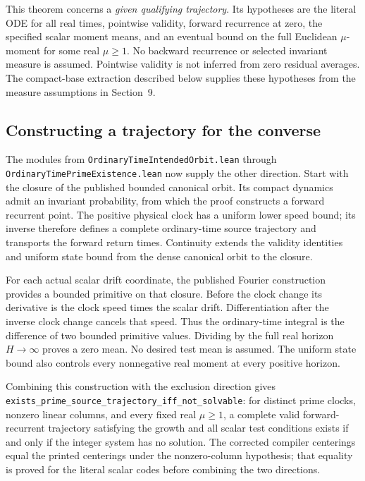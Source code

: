 \documentclass[11pt]{article}
\newcommand{\code}[1]{{\small\nolinkurl{#1}}}
\begin{document}
This theorem concerns a \emph{given qualifying trajectory}. Its hypotheses
are the literal ODE for all real times, pointwise validity, forward
recurrence at zero, the specified scalar moment means, and an eventual
bound on the full Euclidean $\mu$-moment for some real $\mu\ge1$.
No backward recurrence or selected invariant measure is assumed.
Pointwise validity is not inferred from zero residual averages.
The compact-base extraction described below supplies these hypotheses
from the measure assumptions in Section~9.

\subsection{Constructing a trajectory for the converse}

The modules from \code{OrdinaryTimeIntendedOrbit.lean} through
\code{OrdinaryTimePrimeExistence.lean} now supply the other direction.
Start with the closure of the published bounded canonical orbit. Its
compact dynamics admit an invariant probability, from which the proof
constructs a forward recurrent point. The positive physical clock has a
uniform lower speed bound; its inverse therefore defines a complete
ordinary-time source trajectory and transports the forward return times.
Continuity extends the validity identities and uniform state bound from
the dense canonical orbit to the closure.

For each actual scalar drift coordinate, the published Fourier
construction provides a bounded primitive on that closure. Before the
clock change its derivative is the clock speed times the scalar drift.
Differentiation after the inverse clock change cancels that speed. Thus
the ordinary-time integral is the difference of two bounded primitive
values. Dividing by the full real horizon $H\to\infty$ proves a zero
mean. No desired test mean is assumed. The uniform state bound also
controls every nonnegative real moment at every positive horizon.

Combining this construction with the exclusion direction gives
\code{exists_prime_source_trajectory_iff_not_solvable}: for distinct
prime clocks, nonzero linear columns, and every fixed real $\mu\ge1$, a
complete valid forward-recurrent trajectory satisfying the growth and
all scalar test conditions exists if and only if the integer system has
no solution. The corrected compiler centerings equal the printed
centerings under the nonzero-column hypothesis; that equality is proved
for the literal scalar codes before combining the two directions.
\end{document}
